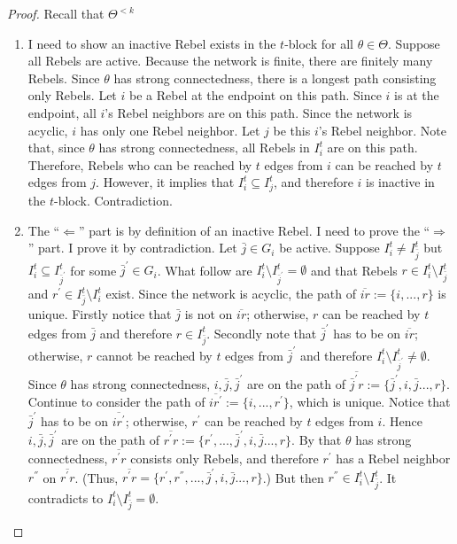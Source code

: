\documentclass[12pt,letter]{article}
\theoremstyle{definition}
\theoremstyle{definition}
\theoremstyle{remark}
\theoremstyle{claim}
\begin{document}
\begin{proof}
Recall that $\Theta^{<k}$
\begin{enumerate}
\item I need to show an inactive Rebel exists in the $t$-block for all $\theta\in\Theta$. Suppose all Rebels are active. Because the network is finite, there are finitely many Rebels. Since $\theta$ has strong connectedness, there is a longest path consisting only Rebels. Let $i$ be a Rebel at the endpoint on this path. Since $i$ is at the endpoint, all $i$'s Rebel neighbors are on this path. Since the network is acyclic, $i$ has only one Rebel neighbor. Let $j$ be this $i$'s Rebel neighbor. Note that, since $\theta$ has strong connectedness, all Rebels in $I^t_i$ are on this path. Therefore, Rebels who can be reached by $t$ edges from $i$ can be reached by $t$ edges from $j$. However, it implies that $I^t_i\subseteq I^t_j$, and therefore $i$ is inactive in the $t$-block. Contradiction.

\item The ``$\Leftarrow$'' part is by definition of an inactive Rebel. I need to prove the ``$\Rightarrow$'' part. I prove it by contradiction. Let $\bar{j}\in G_i$ be active. Suppose $I^t_i\neq I^t_{\bar{j}}$ but $I^t_i\subseteq I^t_{\bar{j}^{'}}$ for some $\bar{j}^{'}\in G_i$. What follow are $I^t_i\setminus I^t_{\bar{j}^{'}}=\emptyset$ and that Rebels $r \in I^t_i\setminus I^t_{\bar{j}}$ and $r^{'}\in I^t_{\bar{j}}\setminus I^t_{i}$ exist. Since the network is acyclic, the path of $\overline{ir}:=\{i,...,r\}$ is unique. Firstly notice that $\bar{j}$ is not on $\overline{ir}$; otherwise, $r$ can be reached by $t$ edges from $\bar{j}$ and therefore $r\in I^t_{\bar{j}}$. Secondly note that $\bar{j}^{'}$ has to be on $\overline{ir}$; otherwise, $r$ cannot be reached by $t$ edges from $\bar{j}^{'}$ and therefore $I^t_i\setminus I^t_{\bar{j}^{'}}\neq \emptyset$. Since $\theta$ has strong connectedness, $i,\bar{j},\bar{j}^{'}$ are on the path of $\overline{\bar{j}^{'}r}:=\{\bar{j}^{'},i,\bar{j}...,r\}$. Continue to consider the path of $\overline{ir^{'}}:=\{i,...,r^{'}\}$, which is unique. Notice that $\bar{j}^{'}$ has to be on $\overline{ir^{'}}$; otherwise, $r^{'}$ can be reached by $t$ edges from $i$. Hence $i,\bar{j},\bar{j}^{'}$ are on the path of $\overline{r^{'}r}:=\{r^{'},...,\bar{j}^{'},i,\bar{j}...,r\}$. By that $\theta$ has strong connectedness, $\overline{r^{'}r}$ consists only Rebels, and therefore $r^{'}$ has a Rebel neighbor $r^{''}$ on $\overline{r^{'}r}$. (Thus, $\overline{r^{'}r}=\{r^{'},r^{''},...,\bar{j}^{'},i,\bar{j}...,r\}$.) But then $r^{''}\in I^t_{i}\setminus I^t_{\bar{j}}$. It contradicts to $I^t_i\setminus I^t_{\bar{j}}=\emptyset$.


\end{enumerate}
\end{proof}
\end{document}
